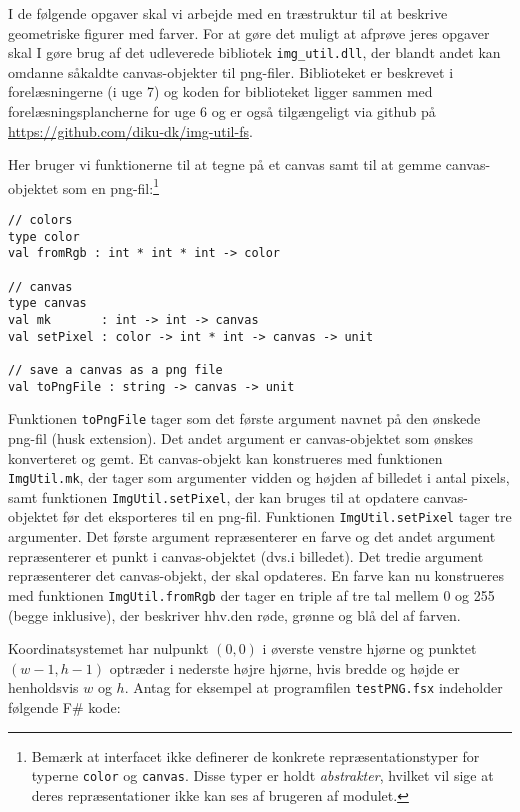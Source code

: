 I de følgende opgaver skal vi arbejde med en træstruktur til at beskrive geometriske
figurer med farver.  For at gøre det muligt at afprøve jeres opgaver
skal I gøre brug af det udleverede bibliotek \texttt{img\_util.dll}, der
blandt andet kan omdanne såkaldte canvas-objekter til png-filer.  Biblioteket er
beskrevet i forelæsningerne (i uge 7) og koden for biblioteket ligger
sammen med forelæsningsplancherne for uge 6 og er også tilgængeligt via github på \url{https://github.com/diku-dk/img-util-fs}.

Her bruger vi funktionerne til at tegne på et canvas samt til at gemme
canvas-objektet som en png-fil:\footnote{Bemærk at interfacet ikke
definerer de konkrete repræsentationstyper for
typerne \lstinline{color} og \lstinline{canvas}. Disse typer er
holdt \emph{abstrakter}, hvilket vil sige at deres repræsentationer
ikke kan ses af brugeren af modulet.}

\begin{lstlisting}[numbers=none,frame=none,mathescape]
// colors
type color
val fromRgb : int * int * int -> color

// canvas
type canvas
val mk       : int -> int -> canvas
val setPixel : color -> int * int -> canvas -> unit

// save a canvas as a png file
val toPngFile : string -> canvas -> unit
\end{lstlisting}

Funktionen \lstinline{toPngFile} tager som det første argument navnet
på den ønskede png-fil (husk extension).  Det andet argument er
canvas-objektet som ønskes konverteret og gemt. Et canvas-objekt kan
konstrueres med funktionen \lstinline{ImgUtil.mk}, der tager som
argumenter vidden og højden af billedet i antal pixels, samt funktionen
\lstinline{ImgUtil.setPixel}, der kan bruges til at opdatere canvas-objektet
før det eksporteres til en png-fil. Funktionen \lstinline{ImgUtil.setPixel}
tager tre argumenter. Det første argument repræsenterer en farve og
det andet argument repræsenterer et punkt i canvas-objektet (dvs.\@ i
billedet). Det tredie argument repræsenterer det canvas-objekt, der
skal opdateres.  En farve kan nu konstrueres med funktionen
\lstinline{ImgUtil.fromRgb} der tager en triple af tre tal mellem 0 og
255 (begge inklusive), der beskriver hhv.\@ den røde, grønne og blå del
af farven.

Koordinatsystemet har nulpunkt $(0,0)$ i øverste venstre hjørne og punktet
$(w-1,h-1)$ optræder i nederste højre hjørne, hvis bredde og højde er henholdsvis $w$
og $h$.  Antag for eksempel at programfilen \texttt{testPNG.fsx}
indeholder følgende F\# kode:

